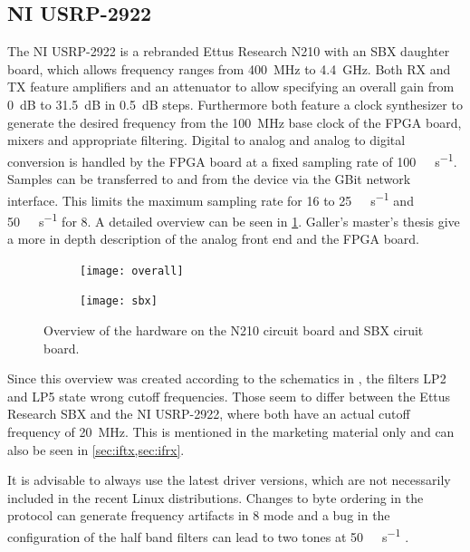 \documentclass[12pt,a4paper,parskip=full]{scrartcl}
\begin{document}
\subsection{NI USRP-2922}
\label{sec:usrp}
The NI USRP-2922 is a rebranded Ettus Research N210 with an SBX daughter board, which
allows frequency ranges from \SI{400}{\mega\hertz} to \SI{4.4}{\giga\hertz}. Both RX
and TX feature amplifiers and an attenuator to allow specifying an overall gain from
\SI{0}{\deci\bel} to \SI{31.5}{\deci\bel} in \SI{0.5}{\deci\bel} steps. Furthermore
both feature a clock synthesizer to generate the desired frequency from the \SI{100}{\mega\hertz}
base clock of the FPGA board, mixers and appropriate filtering. Digital to analog and analog to
digital conversion is handled by the FPGA board at a fixed sampling rate of
\SI{100}{\mega\samples\per\second}. Samples can be transferred to and from the device via the
GBit network interface. This limits the maximum sampling rate for \SI{16}{\bit} to
\SI{25}{\mega\samples\per\second} and \SI{50}{\mega\samples\per\second} for \SI{8}{\bit}.
A detailed overview can be seen in \cref{fig:usrp}. Galler's master's thesis \cite{flo}
give a more in depth description of the analog front end and the FPGA board.
\begin{figure}[htb]
    \begin{subfigure}{0.5\linewidth}
        \centering
        \texttt{[image: overall]}
    \end{subfigure}
    \begin{subfigure}{0.5\linewidth}
        \centering
        \texttt{[image: sbx]}
    \end{subfigure}
    \caption{Overview of the hardware on the N210 circuit board and SBX ciruit board\cite{flo}.}
    \label{fig:usrp}
\end{figure}
Since this overview was created according
to the schematics in \cite{sch_sbx}, the filters LP2 and LP5 state wrong cutoff frequencies.
Those seem to differ between the Ettus Research SBX and the NI USRP-2922, where both have an
actual cutoff frequency of \SI{20}{\mega\hertz}. This is mentioned in the marketing material
\cite{ni_29xx} only and can also be seen in \cref{sec:iftx,sec:ifrx}.


It is advisable to always use the latest driver versions, which are not necessarily included in
the recent Linux distributions. Changes to byte ordering in the protocol \cite{usrp_byte} can
generate frequency artifacts in \SI{8}{\bit} mode and a bug in the configuration of the half
band filters can lead to two tones at \SI{50}{\mega\samples\per\second} \cite{usrp_hb}.
\end{document}
